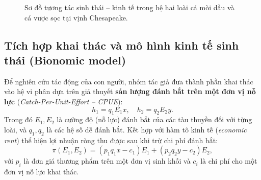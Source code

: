 \begin{figure}[h!]
\caption{Sơ đồ tương tác sinh thái -- kinh tế trong hệ hai loài cá mòi dầu và cá vược sọc tại vịnh Chesapeake.}
\label{fig:intro_flowchart}
\end{figure}

\subsection{Tích hợp khai thác và mô hình kinh tế sinh thái (Bionomic model)}
Để nghiên cứu tác động của con người, nhóm tác giả đưa thành phần khai thác vào hệ vi phân dựa trên giả thuyết \textbf{sản lượng đánh bắt trên một đơn vị nỗ lực} (\textit{Catch-Per-Unit-Effort -- CPUE}):
\begin{equation}
h_1 = q_1 E_1 x, \quad h_2 = q_2 E_2 y.
\end{equation}
Trong đó $E_1, E_2$ là cường độ (nỗ lực) đánh bắt của các tàu thuyền đối với từng loài, và $q_1, q_2$ là các hệ số dễ đánh bắt. Kết hợp với hàm tô kinh tế (\textit{economic rent}) thể hiện lợi nhuận ròng thu được sau khi trừ chi phí đánh bắt:
\begin{equation}
\pi(E_1, E_2) = (p_1 q_1 x - c_1) E_1 + (p_2 q_2 y - c_2) E_2,
\end{equation}
với $p_i$ là đơn giá thương phẩm trên một đơn vị sinh khối và $c_i$ là chi phí cho một đơn vị nỗ lực khai thác.


